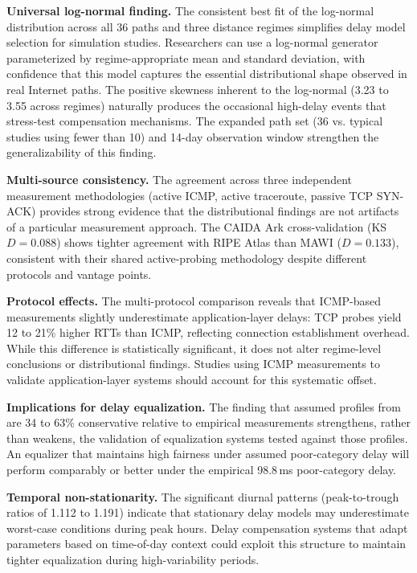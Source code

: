 \documentclass[conference]{IEEEtran}
\begin{document}
\textbf{Universal log-normal finding.} The consistent best fit of the log-normal distribution across all 36 paths and three distance regimes simplifies delay model selection for simulation studies. Researchers can use a log-normal generator parameterized by regime-appropriate mean and standard deviation, with confidence that this model captures the essential distributional shape observed in real Internet paths. The positive skewness inherent to the log-normal (3.23 to 3.55 across regimes) naturally produces the occasional high-delay events that stress-test compensation mechanisms. The expanded path set (36 vs. typical studies using fewer than 10) and 14-day observation window strengthen the generalizability of this finding.

\textbf{Multi-source consistency.} The agreement across three independent measurement methodologies (active ICMP, active traceroute, passive TCP SYN-ACK) provides strong evidence that the distributional findings are not artifacts of a particular measurement approach. The CAIDA Ark cross-validation (KS $D = 0.088$) shows tighter agreement with RIPE Atlas than MAWI ($D = 0.133$), consistent with their shared active-probing methodology despite different protocols and vantage points.

\textbf{Protocol effects.} The multi-protocol comparison reveals that ICMP-based measurements slightly underestimate application-layer delays: TCP probes yield 12 to 21\% higher RTTs than ICMP, reflecting connection establishment overhead. While this difference is statistically significant, it does not alter regime-level conclusions or distributional findings. Studies using ICMP measurements to validate application-layer systems should account for this systematic offset.

\textbf{Implications for delay equalization.} The finding that assumed profiles from~\cite{companion} are 34 to 63\% conservative relative to empirical measurements strengthens, rather than weakens, the validation of equalization systems tested against those profiles. An equalizer that maintains high fairness under assumed poor-category delay will perform comparably or better under the empirical 98.8\,ms poor-category delay.

\textbf{Temporal non-stationarity.} The significant diurnal patterns (peak-to-trough ratios of 1.112 to 1.191) indicate that stationary delay models may underestimate worst-case conditions during peak hours. Delay compensation systems that adapt parameters based on time-of-day context could exploit this structure to maintain tighter equalization during high-variability periods.
\end{document}
